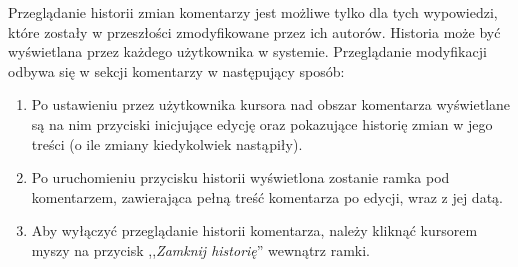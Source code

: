 Przeglądanie historii zmian komentarzy jest możliwe tylko dla tych wypowiedzi, które zostały w przeszłości zmodyfikowane przez ich autorów. Historia może być wyświetlana przez każdego użytkownika w systemie. Przeglądanie modyfikacji odbywa się w sekcji komentarzy w następujący sposób:

\begin{enumerate}[noitemsep]
  \item Po ustawieniu przez użytkownika kursora nad obszar komentarza wyświetlane są na nim przyciski inicjujące edycję oraz pokazujące historię zmian w jego treści (o ile zmiany kiedykolwiek nastąpiły).
  
  \item Po uruchomieniu przycisku historii wyświetlona zostanie ramka pod komentarzem, zawierająca pełną treść komentarza po edycji, wraz z jej datą.
  
  \item Aby wyłączyć przeglądanie historii komentarza, należy kliknąć kursorem myszy na przycisk ,,\emph{Zamknij historię}'' wewnątrz ramki.
\end{enumerate}
